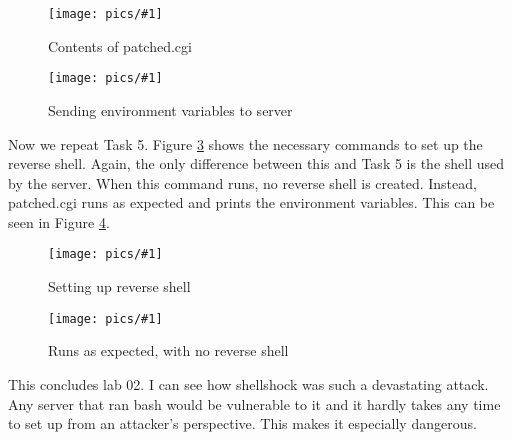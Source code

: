 \documentclass[11pt]{article}
\newcommand{\fig}[2]{ 
\begin{figure}[h]
	\centering
	\caption{#2}
	\texttt{[image: pics/\#1]}
	\label{fig:#1}
\end{figure} 
}
\begin{document}
\fig{task6.1}{Contents of patched.cgi}

\fig{task6.2}{Sending environment variables to server}

Now we repeat Task 5. Figure \ref{fig:task6.3} shows the necessary commands to set up the reverse shell. Again, the only difference between this and Task 5 is the shell used by the server. When this command runs, no reverse shell is created. Instead, patched.cgi runs as expected and prints the environment variables. This can be seen in Figure \ref{fig:task6.4}.

\fig{task6.3}{Setting up reverse shell}

\fig{task6.4}{Runs as expected, with no reverse shell}
\newpage
This concludes lab 02. I can see how shellshock was such a devastating attack. Any server that ran bash would be vulnerable to it and it hardly takes any time to set up from an attacker's perspective. This makes it especially dangerous.
\end{document}
